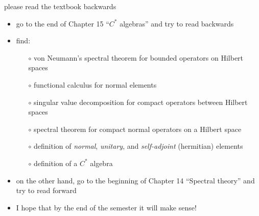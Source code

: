 \documentclass[10pt,hyperref]{beamer}
\begin{document}
\begin{frame}{please read the textbook backwards}

\begin{itemize}
\item go to the end of Chapter 15 ``$C^*$ algebras'' and try to read backwards
\item find:
    \begin{itemize}
    \item[$\circ$] von Neumann's spectral theorem for bounded operators on Hilbert spaces
    \item[$\circ$] functional calculus for normal elements
    \item[$\circ$] singular value decomposition for compact operators between Hilbert spaces
    \item[$\circ$] spectral theorem for compact normal operators on a Hilbert space
    \item[$\circ$] definition of \emph{normal}, \emph{unitary}, and \emph{self-adjoint} (hermitian) elements
    \item[$\circ$] definition of a $C^*$ algebra
    \end{itemize}
\item on the other hand, go to the beginning of Chapter 14 ``Spectral theory'' and try to read forward
\item I hope that by the end of the semester it will make sense!
\end{itemize}
\end{frame}
\end{document}
